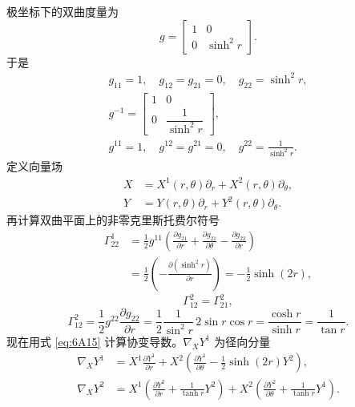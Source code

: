 极坐标下的双曲度量为
\[
  g=\begin{bmatrix}1&0\\0&\sinh^2r\end{bmatrix}.
\]
于是
\begin{gather*}
  g_{11}=1,\quad g_{12}=g_{21}=0,\quad g_{22}=\sinh^2r,\\
  g^{-1}=\begin{bmatrix}1&0\\0&\dfrac{1}{\sinh^2r}\end{bmatrix},\\
  g^{11}=1,\quad g^{12}=g^{21}=0,\quad g^{22}=\frac{1}{\sinh^2r}.
\end{gather*}
定义向量场
\begin{align*}
  X&=X^1(r,\theta)\partial_r+X^2(r,\theta)\partial_\theta,\\
  Y&=Y(r,\theta)\partial_r+Y^2(r,\theta)\partial_\theta.
\end{align*}
再计算双曲平面上的非零克里斯托费尔符号%
%
\begin{align*}
 \Gamma^1_{22}
  &=\frac12g^{11}\left(\frac{\partial g_{21}}{\partial r}
     +\frac{\partial g_{21}}{\partial\theta}-\frac{\partial g_{22}}{\partial r}\right)\\
  &=\frac12\left(-\frac{\partial(\sinh^2r)}{\partial r}\right)=-\frac12\sinh(2r),
\end{align*}
\[
  \Gamma^2_{12}=\Gamma^2_{21},
\]
\[
  \Gamma^2_{12}=\frac12g^{22}\frac{\partial g_{22}}{\partial r}
    =\frac12\frac{1}{\sin^2 r}\,2\sin r\cos r
    =\frac{\cosh r}{\sinh r}=\frac1{\tan r}.
\]
现在用式 \eqref{eq:6A15} 计算协变导数。$\nabla_XY^1$ 为径向分量
\begin{align*}
  \nabla_XY^1&=X^1\frac{\partial Y^1}{\partial r}
      +X^2\left(\frac{\partial Y^1}{\partial\theta}
         -\frac12\sinh(2r)Y^2\right),\\
  \nabla_XY^2&=X^1\left(\frac{\partial Y^2}{\partial r}
        +\frac{1}{\tanh r}Y^2\right)
      +X^2\left(\frac{\partial Y^2}{\partial\theta}
        +\frac{1}{\tanh r}Y^1\right).
\end{align*}
